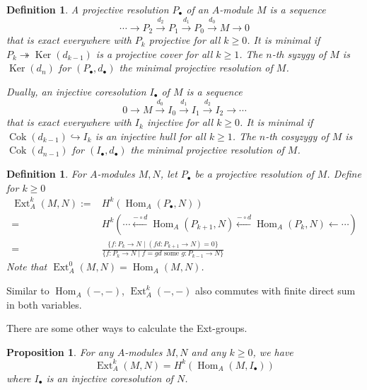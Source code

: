 \documentclass[11pt,a4paper]{article}
\numberwithin{equation}{section}
\theoremstyle{all}
\newtheorem{proposition}[theorem]{Proposition}
\newtheorem{example}[theorem]{Example}
\newtheorem{definition}[theorem]{Definition}
\theoremstyle{remark}
\newcommand{\Ext}{\operatorname{Ext}\nolimits}
\newcommand{\Hom}{\operatorname{Hom}\nolimits}
\newcommand{\Ker}{\operatorname{Ker}\nolimits}
\newcommand{\Cok}{\operatorname{Cok}\nolimits}
\newcommand{\defn}[1]{\textsl{\color{darkblue} #1}}
\begin{document}
\begin{definition}
A \defn{projective resolution} $P_\bullet$ of an $A$-module $M$ is a sequence
\[
\cdots \to P_{2} \xrightarrow{d_2} P_1 \xrightarrow{d_1} P_0\xrightarrow{d_0} M\to 0
\]
that is exact everywhere with $P_k$ projective for all $k\geq 0$.
It is \defn{minimal} if $P_k\twoheadrightarrow \Ker(d_{k-1})$ is a projective cover for all $k\geq 1$.
The \defn{$n$-th syzygy} of $M$ is $\Ker(d_n)$ for $(P_\bullet,d_\bullet)$ the minimal projective resolution of $M$.

Dually, an \defn{injective coresolution} $I_\bullet$ of $M$ is a sequence 
\[
0\to M \xrightarrow{d_0} I_0 \xrightarrow{d_1} I_1 \xrightarrow{d_2} I_2 \to \cdots
\]
that is exact everywhere with $I_k$ injective for all $k\geq 0$.
It is \defn{minimal} if $\Cok(d_{k-1})\hookrightarrow I_k$ is an injective hull for all $k\geq 1$.
The \defn{$n$-th cosyzygy} of $M$ is $\Cok(d_{n-1})$ for $(I_\bullet,d_\bullet)$ the minimal projective resolution of $M$.
\end{definition}

%



\begin{definition}
For $A$-modules $M,N$, let $P_\bullet$ be a projective resolution of $M$.  Define for $k\geq 0$
\begin{align*}
\Ext_A^k(M,N) := & H^k( \Hom_A(P_\bullet,N) ) \\
 =& H^k( \cdots \xleftarrow{-\circ d} \Hom_A(P_{k+1},N) \xleftarrow{-\circ d} \Hom_A(P_k,N) \leftarrow \cdots ) \\ 
= & \frac{\{ f: P_k\to N\mid (fd:P_{k+1}\to N)=0\}}{\{f:P_k\to N\mid f=gd\text{ some }g:P_{k-1}\to N\}}
\end{align*}
Note that $\Ext_A^0(M,N)=\Hom_A(M,N)$.
\end{definition}

Similar to $\Hom_A(-,-)$, $\Ext_A^k(-,-)$ also commutes with finite direct sum in both variables.

There are some other ways to calculate the Ext-groups.

\begin{proposition}
For any $A$-modules $M,N$ and any $k\geq 0$, we have
\[
\Ext_A^k(M,N) = H^k (\Hom_A(M,I_\bullet))
\]
where $I_\bullet$ is an injective coresolution of $N$.
\end{proposition}
\end{document}
